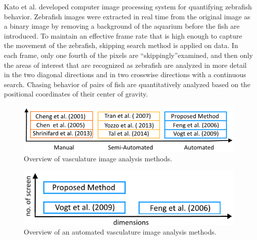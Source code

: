 Kato et al. \cite{Kato04} developed computer image processing system for quantifying zebrafish behavior. Zebrafish images were extracted in real time from the original image as a binary image by removing a background of the aquarium before the fish are introduced. To maintain an effective frame rate that is high enough to capture the movement of the zebrafish, skipping search method is applied on data. In each frame, only one fourth of the pixels are \textquotedblleft skippingly\textquotedblright examined, and then only the areas of interest that are recognized as zebrafish are analyzed in more detail in the two diagonal directions and in two crosswise directions with a continuous search. Chasing behavior of pairs of fish are quantitatively analyzed based on the positional coordinates of their center of gravity.

\begin{figure}[htb] 
 \begin{center}
    \includegraphics[scale=0.65]{figure/analysisReview.png}
  \end{center}
  \caption[Overview of vasculature image analysis methods]{Overview of vasculature image analysis methods.}
 \label{analysis}
\end{figure}

\begin{figure}[htb] 
 \begin{center}
    \includegraphics[scale=0.85]{figure/automatedReview.png}
  \end{center}
  \caption[Overview of an automated vasculature image analysis methods]{Overview of an automated vasculature image analysis methods.}
 \label{automated}
\end{figure}



